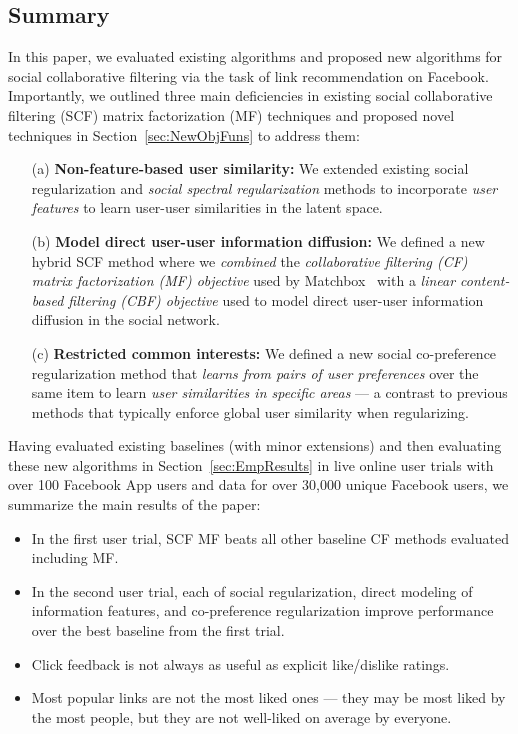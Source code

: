 
\subsection{Summary}

In this paper, we evaluated existing algorithms and proposed new
algorithms for social collaborative filtering via the task of link
recommendation on Facebook.  Importantly, we outlined three main
deficiencies in existing social collaborative filtering (SCF) matrix
factorization (MF) techniques and proposed novel techniques in
Section~\ref{sec:NewObjFuns} to address them:
\begin{itemize}
\item[(a)] {\bf Non-feature-based user similarity:} 
We extended existing social regularization and \emph{social spectral regularization} methods to incorporate \emph{user features} to learn user-user similarities in the latent space.
\item[(b)] {\bf Model direct user-user information diffusion:} 
We defined a new hybrid SCF method where we \emph{combined} the \emph{collaborative filtering (CF) matrix factorization (MF) objective} used by Matchbox~\cite{matchbox} with a \emph{linear content-based filtering (CBF) objective} used to model direct user-user information diffusion in the social network.
\item[(c)] {\bf Restricted common interests:}
We defined a new social co-preference regularization method that \emph{learns from pairs of user preferences} over the same item to learn \emph{user similarities in specific areas} --- a contrast to previous methods that typically enforce global user similarity when regularizing.
\end{itemize}

Having evaluated existing baselines (with minor extensions) and then
evaluating these new algorithms in Section~\ref{sec:EmpResults} in
live online user trials with over 100 Facebook App users and data for
over 30,000 unique Facebook users, we summarize the main results of
the paper:
\begin{itemize}
\item In the first user trial, 
SCF MF beats all other baseline CF methods evaluated including MF.
\item In the second user trial,
each of social regularization, direct modeling of information
features, and co-preference regularization improve performance over the best
baseline from the first trial.
\item Click feedback is not always as useful as explicit like/dislike
ratings.%
\item Most popular links are not the most liked ones --- they may be most
liked by the most people, but they are not well-liked on average by everyone.
\end{itemize}

